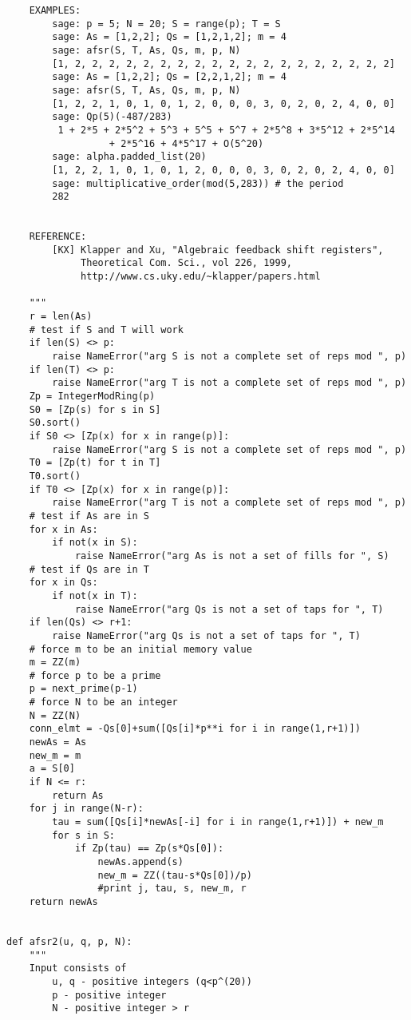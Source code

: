 \begin{verbatim}
    EXAMPLES:
        sage: p = 5; N = 20; S = range(p); T = S
        sage: As = [1,2,2]; Qs = [1,2,1,2]; m = 4
        sage: afsr(S, T, As, Qs, m, p, N)
        [1, 2, 2, 2, 2, 2, 2, 2, 2, 2, 2, 2, 2, 2, 2, 2, 2, 2, 2, 2]
        sage: As = [1,2,2]; Qs = [2,2,1,2]; m = 4
        sage: afsr(S, T, As, Qs, m, p, N)
        [1, 2, 2, 1, 0, 1, 0, 1, 2, 0, 0, 0, 3, 0, 2, 0, 2, 4, 0, 0]
        sage: Qp(5)(-487/283)
         1 + 2*5 + 2*5^2 + 5^3 + 5^5 + 5^7 + 2*5^8 + 3*5^12 + 2*5^14
				  + 2*5^16 + 4*5^17 + O(5^20)
        sage: alpha.padded_list(20)
        [1, 2, 2, 1, 0, 1, 0, 1, 2, 0, 0, 0, 3, 0, 2, 0, 2, 4, 0, 0]
        sage: multiplicative_order(mod(5,283)) # the period
        282


    REFERENCE:
        [KX] Klapper and Xu, "Algebraic feedback shift registers",
             Theoretical Com. Sci., vol 226, 1999,
             http://www.cs.uky.edu/~klapper/papers.html

    """
    r = len(As)
    # test if S and T will work
    if len(S) <> p:
        raise NameError("arg S is not a complete set of reps mod ", p)
    if len(T) <> p:
        raise NameError("arg T is not a complete set of reps mod ", p)
    Zp = IntegerModRing(p)
    S0 = [Zp(s) for s in S]
    S0.sort()
    if S0 <> [Zp(x) for x in range(p)]:
        raise NameError("arg S is not a complete set of reps mod ", p)
    T0 = [Zp(t) for t in T]
    T0.sort()
    if T0 <> [Zp(x) for x in range(p)]:
        raise NameError("arg T is not a complete set of reps mod ", p)
    # test if As are in S
    for x in As:
        if not(x in S):
            raise NameError("arg As is not a set of fills for ", S)
    # test if Qs are in T
    for x in Qs:
        if not(x in T):
            raise NameError("arg Qs is not a set of taps for ", T)
    if len(Qs) <> r+1:
        raise NameError("arg Qs is not a set of taps for ", T)
    # force m to be an initial memory value
    m = ZZ(m)
    # force p to be a prime
    p = next_prime(p-1)
    # force N to be an integer
    N = ZZ(N)
    conn_elmt = -Qs[0]+sum([Qs[i]*p**i for i in range(1,r+1)])
    newAs = As
    new_m = m
    a = S[0]
    if N <= r:
        return As
    for j in range(N-r):
        tau = sum([Qs[i]*newAs[-i] for i in range(1,r+1)]) + new_m
        for s in S:
            if Zp(tau) == Zp(s*Qs[0]):
                newAs.append(s)
                new_m = ZZ((tau-s*Qs[0])/p)
                #print j, tau, s, new_m, r
    return newAs


def afsr2(u, q, p, N): 
    """
    Input consists of 
        u, q - positive integers (q<p^(20))
        p - positive integer
        N - positive integer > r


\end{verbatim}
